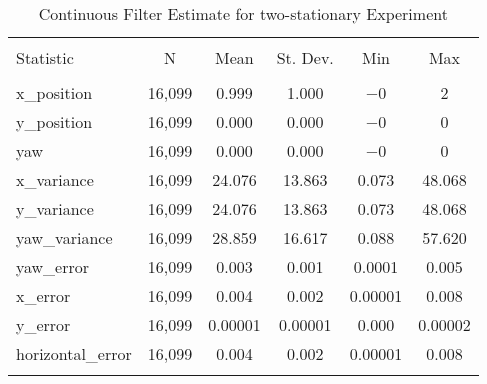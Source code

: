 
\begin{table}[h] \centering 
  \caption{Continuous Filter Estimate for two-stationary Experiment} 
  \label{tab:two_stationary_continuous_summary} 
\begin{tabular}{@{\extracolsep{5pt}}lccccc} 
\\[-1.8ex]\hline 
\hline \\[-1.8ex] 
Statistic & \multicolumn{1}{c}{N} & \multicolumn{1}{c}{Mean} & \multicolumn{1}{c}{St. Dev.} & \multicolumn{1}{c}{Min} & \multicolumn{1}{c}{Max} \\ 
\hline \\[-1.8ex] 
x\_position & 16,099 & \num{0.999} & \num{1.000} & $-$0 & 2 \\ 
y\_position & 16,099 & \num{0.000} & \num{0.000} & $-$0 & 0 \\ 
yaw & 16,099 & \num{0.000} & \num{0.000} & $-$0 & 0 \\ 
x\_variance & 16,099 & \num{24.076} & \num{13.863} & \num{0.073} & \num{48.068} \\ 
y\_variance & 16,099 & \num{24.076} & \num{13.863} & \num{0.073} & \num{48.068} \\ 
yaw\_variance & 16,099 & \num{28.859} & \num{16.617} & \num{0.088} & \num{57.620} \\ 
yaw\_error & 16,099 & \num{0.003} & \num{0.001} & \num{0.0001} & \num{0.005} \\ 
x\_error & 16,099 & \num{0.004} & \num{0.002} & \num{0.00001} & \num{0.008} \\ 
y\_error & 16,099 & \num{0.00001} & \num{0.00001} & \num{0.000} & \num{0.00002} \\ 
horizontal\_error & 16,099 & \num{0.004} & \num{0.002} & \num{0.00001} & \num{0.008} \\ 
\hline \\[-1.8ex] 
\end{tabular} 
\end{table} 
